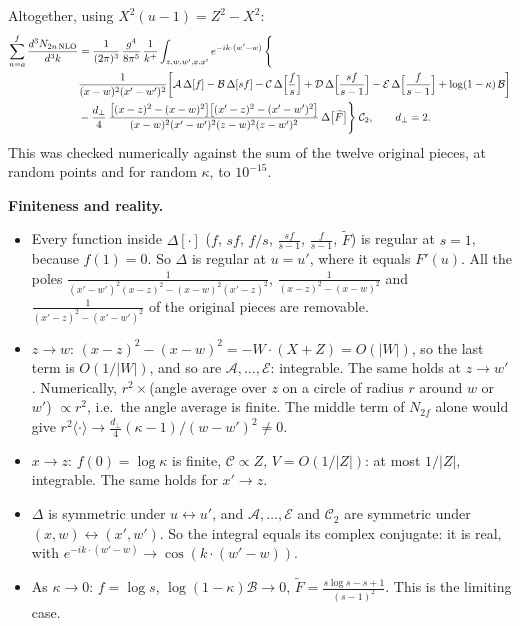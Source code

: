 \documentclass[9pt]{article}
\numberwithin{equation}{section}
\begin{document}
{\begin{itemize}
\end{itemize}
Altogether, using $X^{2}(u-1)=Z^{2}-X^{2}$:
\begin{align}
\sum_{n=a}^{f}\frac{d^{3}N_{2n\,\rm NLO}}{d^{3}k}&=\frac{1}{(2\pi)^{3}}\,\frac{g^{4}}{8\pi^{5}}\,\frac{1}{k^{+}}\int_{z,w,w',x,x'}e^{-ik\cdot(w'-w)}\,\Bigg\{\notag\\
&\frac{1}{(x-w)^{2}(x'-w')^{2}}\bigg[\mathcal A\,\Delta[f]-\mathcal B\,\Delta[sf]-\mathcal C\,\Delta\Big[\frac{f}{s}\Big]+\mathcal D\,\Delta\Big[\frac{sf}{s-1}\Big]-\mathcal E\,\Delta\Big[\frac{f}{s-1}\Big]+\log(1-\kappa)\,\mathcal B\bigg]\notag\\
&-\frac{d_{\perp}}{4}\,\frac{\big[(x-z)^{2}-(x-w)^{2}\big]\big[(x'-z)^{2}-(x'-w')^{2}\big]}{(x-w)^{2}(x'-w')^{2}(z-w)^{2}(z-w')^{2}}\,\Delta\big[\widetilde F\big]\Bigg\}\;\mathcal C_{2},\qquad d_{\perp}=2.
\end{align}
This was checked numerically against the sum of the twelve original pieces, at random points and for random $\kappa$, to $10^{-15}$.

\noindent\textbf{Finiteness and reality.}
\begin{itemize}
\item Every function inside $\Delta[\cdot]$ ($f$, $sf$, $f/s$, $\frac{sf}{s-1}$, $\frac{f}{s-1}$, $\widetilde F$) is regular at $s=1$, because $f(1)=0$. So $\Delta$ is regular at $u=u'$, where it equals $F'(u)$. All the poles $\frac{1}{(x'-w')^{2}(x-z)^{2}-(x-w)^{2}(x'-z)^{2}}$, $\frac{1}{(x-z)^{2}-(x-w)^{2}}$ and $\frac{1}{(x'-z)^{2}-(x'-w')^{2}}$ of the original pieces are removable.
\item $z\to w$: $(x-z)^{2}-(x-w)^{2}=-W\cdot(X+Z)=O(|W|)$, so the last term is $O(1/|W|)$, and so are $\mathcal A,\dots,\mathcal E$: integrable. The same holds at $z\to w'$. Numerically, $r^{2}\times$(angle average over $z$ on a circle of radius $r$ around $w$ or $w'$) $\propto r^{2}$, i.e.\ the angle average is finite. The middle term of $N_{2f}$ alone would give $r^{2}\langle\cdot\rangle\to\frac{d_{\perp}}{4}(\kappa-1)/(w-w')^{2}\neq0$.
\item $x\to z$: $f(0)=\log\kappa$ is finite, $\mathcal C\propto Z$, $V=O(1/|Z|)$: at most $1/|Z|$, integrable. The same holds for $x'\to z$.
\item $\Delta$ is symmetric under $u\leftrightarrow u'$, and $\mathcal A,\dots,\mathcal E$ and $\mathcal C_{2}$ are symmetric under $(x,w)\leftrightarrow(x',w')$. So the integral equals its complex conjugate: it is real, with $e^{-ik\cdot(w'-w)}\to\cos(k\cdot(w'-w))$.
\item As $\kappa\to0$: $f=\log s$, $\log(1-\kappa)\mathcal B\to0$, $\widetilde F=\frac{s\log s-s+1}{(s-1)^{2}}$. This is the limiting case.
\end{itemize}}
\end{document}
